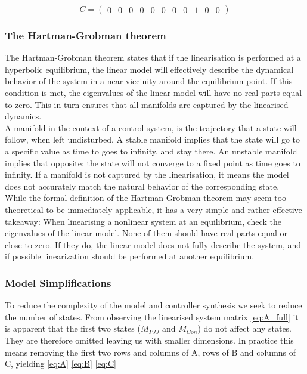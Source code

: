 \begin{equation}  \label{eq:C_full}
	C = \left(\begin{array}{ccccccccccc}
		0 & 0 & 0 & 0 & 0 & 0 & 0 & 0 & 1 & 0 & 0
	\end{array}\right)
\end{equation}



\subsubsection{The Hartman-Grobman theorem}

The Hartman-Grobman theorem states that if the linearisation is performed at a hyperbolic equilibrium, the linear model will effectively describe the dynamical behavior of the system in a near viccinity around the equilibrium point. If this condition is met, the eigenvalues of the linear model will have no real parts equal to zero. This in turn ensures that all manifolds are captured by the linearised dynamics. \\
A manifold in the context of a control system, is the trajectory that a state will follow, when left undisturbed. A stable manifold implies that the state will go to a specific value as time to goes to infinity, and stay there. An unstable manifold implies that opposite: the state will not converge to a fixed point as time goes to infinity. If a manifold is not captured by the linearisation, it means the model does not accurately match the natural behavior of the corresponding state.\\

While the formal definition of the Hartman-Grobman theorem may seem too theoretical to be immediately applicable, it has a very simple and rather effective takeaway: When linearising a nonlinear system at an equilibrium, check the eigenvalues of the linear model. None of them should have real parts equal or close to zero. If they do, the linear model does not fully describe the system, and if possible linearization should be performed at another equilibrium.


\subsubsection{Model Simplifications}
To reduce the complexity of the model and controller synthesis we seek to reduce the number of states.
From observing the linearised system matrix \cref{eq:A_full} it is apparent that the first two states ($M_{PJJ}$ and $M_{Con}$) do not affect any states. They are therefore omitted leaving us with smaller dimensions. In practice this means removing the first two rows and columns of A, rows of B and columns of C, yielding \cref{eq:A} \cref{eq:B} \cref{eq:C}

